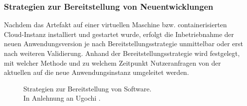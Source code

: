 \subsubsection{Strategien zur Bereitstellung von Neuentwicklungen}
\label{sec:Bereitstellungs_Strategien}
Nachdem das Artefakt auf einer virtuellen Maschine bzw. containerisierten Cloud-Instanz installiert und gestartet wurde, erfolgt die Inbetriebnahme der neuen Anwendungsversion je nach Bereitstellungsstrategie unmittelbar oder erst nach weiteren Validierung. Anhand der Bereitstellungsstrategie wird festgelegt, mit welcher Methode und zu welchem Zeitpunkt Nutzeranfragen von der aktuellen auf die neue Anwendungsinstanz umgeleitet werden.
\begin{center}
	\begin{figure}[H]
		\centering
		\caption[Strategien zur Bereitstellung von Software]{Strategien zur Bereitstellung von Software.\\ In Anlehnung an Ugochi \cite{Ugochi.20220503}.}
		\label{fig:DS}
	\end{figure}
\end{center}
\vspace*{-10mm}
